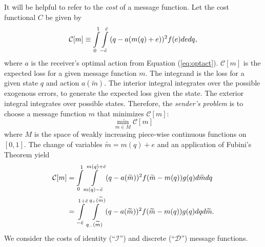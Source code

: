 \documentclass[12pt]{article}
\begin{document}
It will be helpful to refer to the \textit{cost }of a message function. Let the cost functional $C$ be given by 
\begin{equation}
	\mathcal{C}[m]\equiv \int\displaylimits_{0}^{1}{\int\displaylimits_{-\bar{e}}^{\bar{e}}{(q-a(m(q)+e))^{2}f(e)de}dq},  
\end{equation}
where $a$ is the receiver's optimal action from Equation (\ref{eq:optact}). $\mathcal{C}[m]$ is the expected loss for a given message function $m$. The integrand is the loss for a given state $q$ and action $a(\widetilde{m})$. The interior integral integrates over the possible exogenous errors, to generate the expected loss given the state. The exterior integral integrates over possible states. Therefore, the \textit{sender's problem} is to choose a message function $m$ that minimizes $\mathcal{C}[m]$: 
\begin{equation}
	\min_{m\in M}\mathcal{C}[m]
\end{equation}
where $M$ is the space of weakly increasing piece-wise continuous functions on $[0,1]$. The change of variables $\widetilde{m}=m(q)+e$ and an application of Fubini's Theorem yield 
\begin{align}
	\mathcal{C}[m]& =\int\displaylimits_{0}^{1}{\int\displaylimits_{m(q)-\bar{e}}^{m(q)+\bar{e}}{(q-a( \widetilde{m}))^{2}f(\widetilde{m}-m(q))g(q)d\widetilde{m}}dq} \\
	& =\int\displaylimits_{-\bar{e}}^{1+\bar{e}}{\int\displaylimits_{q_{-}(\widetilde{m})}^{q_{+}(\widetilde{m})}{(q-a(\widetilde{m}))^{2}f(\widetilde{m}-m(q))g(q)dq}d\widetilde{m}}.
\end{align}
We consider the costs of identity (``$\mathcal{I}$'') and discrete (``$\mathcal{D}$'') message functions.

\end{document}
